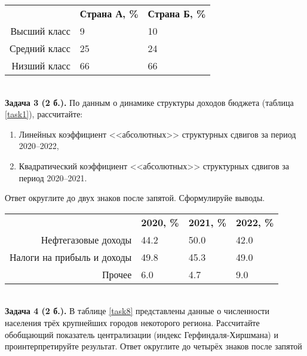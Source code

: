 \documentclass{article}
\begin{document}
\begin{minipage}{\textwidth}
\centering
\begin{tabularx}{0.7\textwidth}{rYY}
\toprule
 & \textbf{Страна А, \%} & \textbf{Страна Б, \%} \\
\cmidrule(lr){2-2}\cmidrule(lr){3-3}
Высший класс & 9 & 10 \\

Средний класс & 25 & 24 \\

Низший класс & 66 & 66 \\
\bottomrule
\end{tabularx}
\label{task6}
\end{minipage} \\[35pt]

\textbf{Задача 3 (2 б.).} По данным о динамике структуры доходов бюджета (таблица \ref{task1}), рассчитайте:
\begin{enumerate}[leftmargin=40pt]
\item Линейных коэффициент <<абсолютных>> структурных сдвигов за период 2020--2022,
\item Квадратический коэффициент <<абсолютных>> структурных сдвигов за период 2020--2021.\medskip
\end{enumerate}

Ответ округлите до двух знаков после запятой. Сформулируйе выводы.\\

\begin{minipage}{\textwidth}
\centering
\begin{tabularx}{0.8\textwidth}{rYYY}
\toprule
 & \textbf{2020, \%} & \textbf{2021, \%} & \textbf{2022, \%} \\
\cmidrule(lr){2-2}\cmidrule(lr){3-3}\cmidrule(lr){4-4}
Нефтегазовые доходы & 44.2 & 50.0 & 42.0 \\

Налоги на прибыль и доходы & 49.8 & 45.3 & 49.0 \\

Прочее & 6.0 & 4.7 & 9.0 \\
\bottomrule
\end{tabularx}
\label{task1}
\end{minipage} \\[35pt]

\textbf{Задача 4 (2 б.).} В таблице \ref{task8} представлены данные о численности населения трёх крупнейших городов некоторого региона. Рассчитайте обобщающий показатель централизации (индекс Герфиндаля-Хиршмана) и проинтерпретируйте результат. Ответ округлите до четырёх знаков после запятой\\
\end{document}
